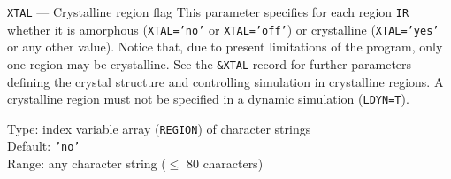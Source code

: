 \begin{keydescription}{\texttt{XTAL} --- Crystalline region flag}
%
  This parameter specifies for each region \texttt{IR} whether it is amorphous
  (\texttt{XTAL='no'} or \texttt{XTAL='off'}) or crystalline
  (\texttt{XTAL='yes'} or any other value).  Notice that, due to present
  limitations of the program, only one region may be crystalline. See the
  \texttt{\&XTAL} record for further parameters defining the crystal
  structure and controlling simulation in crystalline regions. A crystalline
  region must not be specified in a dynamic simulation (\texttt{LDYN=T}).
%
  \begin{keytab}
    Type:    \> index variable array (\texttt{REGION}) of character strings \\
    Default: \> \texttt{'no'} \\
    Range:   \> any character string ($\le$ 80 characters)
  \end{keytab}
\end{keydescription}








